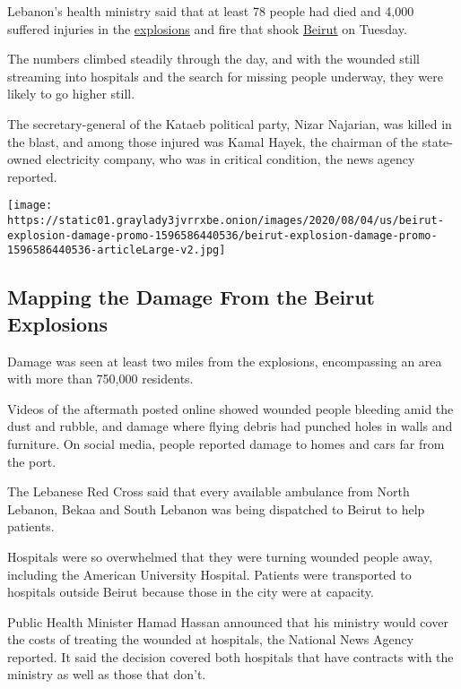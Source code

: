 Lebanon's health ministry said that at least 78 people had died and
4,000 suffered injuries in the
\href{https://www.nytimes3xbfgragh.onion/2020/08/04/world/middleeast/lebanon-explosion-beirut.html}{explosions}
and fire that shook
\href{https://www.nytimes3xbfgragh.onion/2020/08/04/world/middleeast/lebanon-explosion-beirut.html}{Beirut}
on Tuesday.

The numbers climbed steadily through the day, and with the wounded still
streaming into hospitals and the search for missing people underway,
they were likely to go higher still.

The secretary-general of the Kataeb political party, Nizar Najarian, was
killed in the blast, and among those injured was Kamal Hayek, the
chairman of the state-owned electricity company, who was in critical
condition, the news agency reported.

\href{https://www.nytimes3xbfgragh.onion/interactive/2020/08/04/world/middleeast/beirut-explosion-damage.html}{}

\texttt{[image: https://static01.graylady3jvrrxbe.onion/images/2020/08/04/us/beirut-explosion-damage-promo-1596586440536/beirut-explosion-damage-promo-1596586440536-articleLarge-v2.jpg]}

\hypertarget{mapping-the-damage-from-the-beirut-explosions}{%
\subsection{Mapping the Damage From the Beirut
Explosions}\label{mapping-the-damage-from-the-beirut-explosions}}

Damage was seen at least two miles from the explosions, encompassing an
area with more than 750,000 residents.

Videos of the aftermath posted online showed wounded people bleeding
amid the dust and rubble, and damage where flying debris had punched
holes in walls and furniture. On social media, people reported damage to
homes and cars far from the port.

The Lebanese Red Cross said that every available ambulance from North
Lebanon, Bekaa and South Lebanon was being dispatched to Beirut to help
patients.

Hospitals were so overwhelmed that they were turning wounded people
away, including the American University Hospital. Patients were
transported to hospitals outside Beirut because those in the city were
at capacity.

Public Health Minister Hamad Hassan announced that his ministry would
cover the costs of treating the wounded at hospitals, the National News
Agency reported. It said the decision covered both hospitals that have
contracts with the ministry as well as those that don't.

